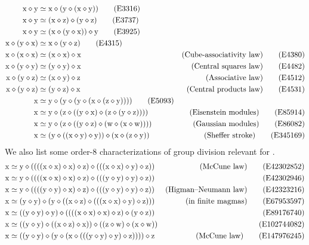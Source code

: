\begin{align}
        \x \op \y &\formaleq \x \op (\y \op (\x \op \y)) \label{eq3316}\tag{E3316} \\
        \x \op \y &\formaleq (\x \op \z) \op (\y \op \z) \label{eq3737}\tag{E3737} \\
        \x \op \y &\formaleq (\x \op (\y \op \x)) \op \y \label{eq3925}\tag{E3925} \\
        \x \op (\y \op \x) &\formaleq \x \op (\y \op \z) \label{eq4315}\tag{E4315} \\
        \x \op (\x \op \x) &\formaleq (\x \op \x) \op \x & \hbox{(Cube-associativity law)} \label{eq4380}\tag{E4380} \\
        \x \op (\y \op \y) &\formaleq (\y \op \y) \op \x & \hbox{(Central squares law)} \label{eq4482}\tag{E4482} \\
        \x \op (\y \op \z) &\formaleq (\x \op \y) \op \z & \hbox{(Associative law)} \label{eq4512}\tag{E4512} \\
        \x \op (\y \op \z) &\formaleq (\y \op \z) \op \x & \hbox{(Central products law)} \label{eq4531}\tag{E4531} \\
        \x &\formaleq \y \op (\y \op (\y \op (\x \op (\z \op \y)))) \label{eq5093}\tag{E5093} \\
        \x &\formaleq \y \op (\z \op ((\y \op \x) \op (\z \op (\y \op \z)))) & \hbox{(Eisenstein modules)} \label{eq85914} \tag{E85914} \\
        \x &\formaleq \y \op (\z \op ((\y \op \z) \op (\w \op (\x \op \w)))) & \hbox{(Gaussian modules)} \label{eq86082} \tag{E86082} \\
        \x &\formaleq (\y \op ((\x \op \y) \op \y)) \op (\x \op (\z \op \y)) & \hbox{(Sheffer stroke)} \label{eq345169}\tag{E345169}
\end{align}
We also list some order-$8$ characterizations of group division relevant for .
\begin{align}
        \x &\formaleq \y \op ((((\x \op \x) \op \x) \op \z) \op (((\x \op \x) \op \y) \op \z)) & \hbox{(McCune law)} \label{eq42302852}\tag{E42302852} \\
        \x &\formaleq \y \op ((((\x \op \x) \op \x) \op \z) \op (((\y \op \y) \op \y) \op \z)) & \label{eq42302946}\tag{E42302946} \\
        \x &\formaleq \y \op ((((\y \op \y) \op \x) \op \z) \op (((\y \op \y) \op \y) \op \z)) & \hbox{(Higman--Neumann law)} \label{eq42323216}\tag{E42323216} \\
        \x &\formaleq (\y \op \y) \op (\y \op ((\x \op \z) \op (((\x \op \x) \op \y) \op \z))) & \hbox{(in finite magmas)} \label{eq67953597}\tag{E67953597} \\
        \x &\formaleq ((\y \op \y) \op \y) \op ((((\x \op \x) \op \x) \op \z) \op (\y \op \z)) & \label{eq89176740}\tag{E89176740} \\
        \x &\formaleq ((\y \op \y) \op ((\x \op \z) \op \x)) \op ((\z \op \w) \op (\x \op \w)) & \label{eq102744082}\tag{E102744082} \\
        \x &\formaleq ((\y \op \y) \op (\y \op (\x \op (((\y \op \y) \op \y) \op \z)))) \op \z & \hbox{(McCune law)} \label{eq147976245}\tag{E147976245}
\end{align}
\endgroup
